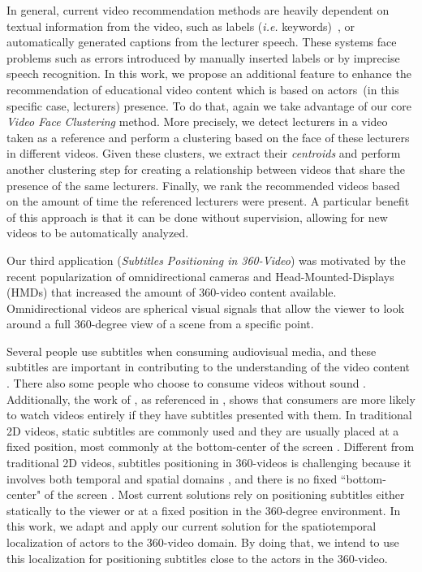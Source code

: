 In general, current video recommendation methods are heavily dependent on textual information from the video, such as labels (\textit{i.e.} keywords)~\cite{mahajan2015optimising,omisore2014personalized}, or automatically generated captions \cite{barrere2020utilizaccao} from the lecturer speech. These systems face problems such as errors introduced by manually inserted labels or by imprecise speech recognition.
In this work, we propose an additional feature to enhance the recommendation of educational video content which is based on actors~(in this specific case, lecturers) presence. To do that, again we take advantage of our core \emph{Video Face Clustering} method. More precisely, we detect lecturers in a video taken as a reference and perform a clustering based on the face of these lecturers in different videos. Given these clusters, we extract their \textit{centroids} and perform another clustering step for creating a relationship between videos that share the presence of the same lecturers. Finally, we rank the recommended videos based on the amount of time the referenced lecturers were present.
A particular benefit of this approach is that it can be done without supervision, allowing for new videos to be automatically analyzed.

Our third application (\emph{Subtitles Positioning in 360-Video}) was motivated by the recent popularization of omnidirectional cameras and Head-Mounted-Displays (HMDs) that increased the amount of 360-video content available. Omnidirectional videos are spherical visual signals that allow the viewer to look around a full 360-degree view of a scene from a specific point.

Several people use subtitles when consuming audiovisual media, and these subtitles are important in contributing to the understanding of the video content \cite{brown_subtitles_2017}. There also some people who choose to consume videos without sound \cite{hughes_disruptive_2019}. Additionally, the work of \cite{hayati2011effect}, as referenced in \cite{hughes_disruptive_2019}, shows that consumers are more likely to watch videos entirely if they have subtitles presented with them. In traditional 2D videos, static subtitles are commonly used and they are usually placed at a fixed position, most commonly at the bottom-center of the screen \cite{rothe_dynamic_2018}.
Different from traditional 2D videos, subtitles positioning in 360-videos is challenging because it involves both temporal and spatial domains \cite{agullo2019making}, and there is no fixed ``bottom-center" of the screen \cite{brown_subtitles_2017}. Most current solutions rely on positioning subtitles either statically to the viewer or at a fixed position in the 360-degree environment. 
In this work, we adapt and apply our current solution for the spatiotemporal localization of actors to the 360-video domain. By doing that, we intend to use this localization for positioning subtitles close to the actors in the 360-video.

